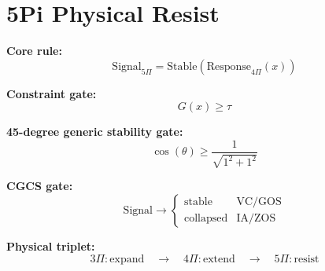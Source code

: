 \section*{5Pi Physical Resist}

\textbf{Core rule:}
\[
\mathrm{Signal}_{5\Pi}
=
\mathrm{Stable}\left(\mathrm{Response}_{4\Pi}(x)\right)
\]

\textbf{Constraint gate:}
\[
G(x) \geq \tau
\]

\textbf{45-degree generic stability gate:}
\[
\cos(\theta) \geq \frac{1}{\sqrt{1^2 + 1^2}}
\]

\textbf{CGCS gate:}
\[
\mathrm{Signal} \rightarrow
\begin{cases}
\mathrm{stable} & \text{VC/GOS} \\
\mathrm{collapsed} & \text{IA/ZOS}
\end{cases}
\]

\textbf{Physical triplet:}
\[
3\Pi:\mathrm{expand}
\quad\rightarrow\quad
4\Pi:\mathrm{extend}
\quad\rightarrow\quad
5\Pi:\mathrm{resist}
\]
